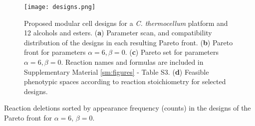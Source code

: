 \begin{figure}[hp]
    \centering
    \texttt{[image: designs.png]}
    \caption[Proposed modular cell designs for a \protect\textit{C. thermocellum} platform and 12 alcohols and esters]{Proposed modular cell designs for a \protect\textit{C. thermocellum} platform and 12 alcohols and esters. (\textbf{a}) Parameter scan, and compatibility distribution of the designs in each resulting Pareto front. (\textbf{b}) Pareto front for parameters $\alpha=6,\beta=0$. (\textbf{c}) Pareto set for parameters $\alpha=6,\beta=0$. Reaction names and formulas are included in Supplementary Material \ref{sm:figures} - Table S3. (\textbf{d}) Feasible phenotypic spaces according to reaction stoichiometry for selected designs.}
   \label{fig6:designs}
\end{figure}

\begin{table}[hp]
    \caption{Reaction deletions sorted by appearance frequency (counts) in the designs of the Pareto front for $\alpha=6,\,\beta=0$.}
    \centering
    
    \label{tab6:deletions}
\end{table}

